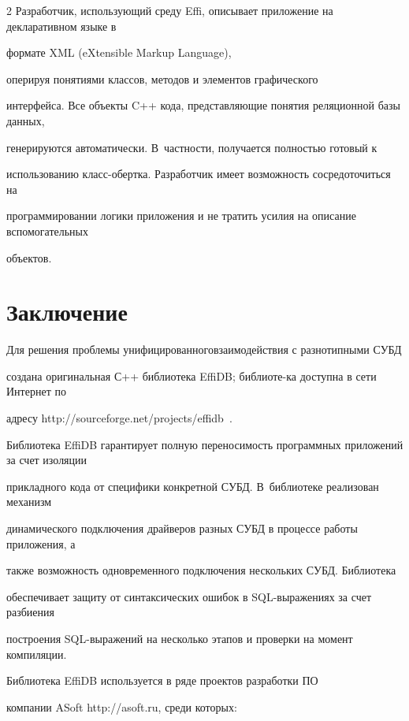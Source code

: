 \begin{multicols}{2}
Разработчик, использующий среду Effi, описывает приложение на декларативном языке в 

формате XML (eXtensible Markup Language), 

оперируя понятиями классов, методов и элементов графического 

интерфейса. Все объекты C++ кода, представляющие понятия реляционной базы данных, 

генерируются автоматически. В~част\-ности, получается полностью готовый к 

использованию класс-оберт\-ка. Разработчик имеет возможность сосредоточиться на 

программировании логики приложения и не тратить усилия на описание вспомогательных 

объектов.



\section{Заключение}



Для решения проблемы унифицированного\linebreak взаимодействия с разнотипными СУБД 

создана оригинальная С++ библиотека EffiDB; библиоте-\linebreak ка доступна в сети Интернет по 

адресу {\sf http://\linebreak sourceforge.net/projects/effidb}~\cite{7-y}.



Библиотека EffiDB гарантирует полную переносимость программных приложений за счет изоляции 

прикладного кода от специфики конкретной СУБД. В~библиотеке реализован механизм 

динамического подключения драйверов разных СУБД в процессе работы приложения, а 

также возможность одновременного подключения нескольких СУБД. Библиотека 

обеспечивает защиту от синтаксических ошибок в SQL-выражениях за счет разбиения 

построения SQL-выражений на несколько этапов и проверки на момент компиляции.



Библиотека EffiDB используется в ряде проектов разработки ПО 

компании ASoft {\sf http://asoft.ru}, среди которых:


\end{multicols}
